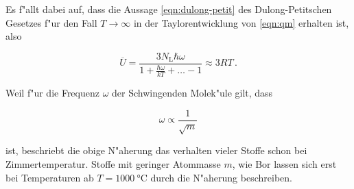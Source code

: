 		Es f"allt dabei auf, dass die Aussage \eqref{eqn:dulong-petit} des Dulong-Petitschen Gesetzes f"ur den Fall $T \rightarrow \infty$ in der Taylorentwicklung von \eqref{eqn:qm} erhalten ist, also

		\begin{equation*}
			\overline{U} = \frac{3 N_\mathrm{L} \hbar \omega}{1 + \frac{\hbar \omega}{k T} + \dots - 1} \approx 3 RT \,.
		\end{equation*}

		Weil f"ur die Frequenz $\omega$ der Schwingenden Molek"ule gilt, dass

		\begin{equation*}
			\omega \propto \frac{1}{\sqrt{m}}
		\end{equation*}

		ist, beschriebt die obige N"aherung das verhalten vieler Stoffe schon bei Zimmertemperatur.
		Stoffe mit geringer Atommasse $m$, wie Bor lassen sich erst bei Temperaturen ab $T = \SI{1000}{\celsius}$ durch die N"aherung beschreiben.